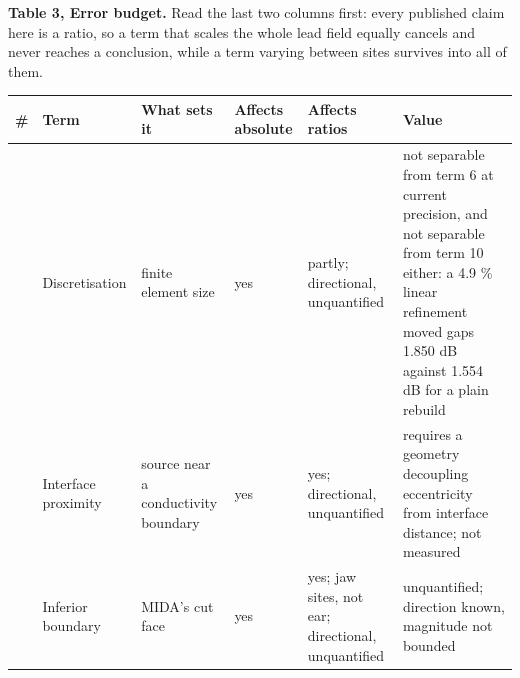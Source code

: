\documentclass[
  11pt,
  a4paper,
]{article}
\newcounter{none} %
\begin{document}
\textbf{Table 3, Error budget.} Read the last two columns first: every published
claim here is a ratio, so a term that scales the whole lead field equally
cancels and never reaches a conclusion, while a term varying between sites
survives into all of them.

{\def\LTcaptype{none} %
\begin{longtable}[]{@{}
  >{\raggedright\arraybackslash}p{}
  >{\raggedright\arraybackslash}p{}
  >{\raggedright\arraybackslash}p{}
  >{\raggedright\arraybackslash}p{}
  >{\raggedright\arraybackslash}p{}
  >{\raggedright\arraybackslash}p{}@{}}
\toprule\noalign{}
\begin{minipage}[b]{\linewidth}\raggedright
\#
\end{minipage} & \begin{minipage}[b]{\linewidth}\raggedright
Term
\end{minipage} & \begin{minipage}[b]{\linewidth}\raggedright
What sets it
\end{minipage} & \begin{minipage}[b]{\linewidth}\raggedright
Affects absolute
\end{minipage} & \begin{minipage}[b]{\linewidth}\raggedright
Affects ratios
\end{minipage} & \begin{minipage}[b]{\linewidth}\raggedright
Value
\end{minipage} \\
\midrule\noalign{}
\endhead
\bottomrule\noalign{}
\endlastfoot
1 & Discretisation & finite element size & yes & partly; directional, unquantified & not separable from term 6 at current precision, and not separable from term 10 either: a 4.9 \% linear refinement moved gaps 1.850 dB against 1.554 dB for a plain rebuild \\
2 & Interface proximity & source near a conductivity boundary & yes & yes; directional, unquantified & requires a geometry decoupling eccentricity from interface distance; not measured \\
3 & Inferior boundary & MIDA's cut face & yes & yes; jaw sites, not ear; directional, unquantified & unquantified; direction known, magnitude not bounded \\

\end{longtable}}
\end{document}

